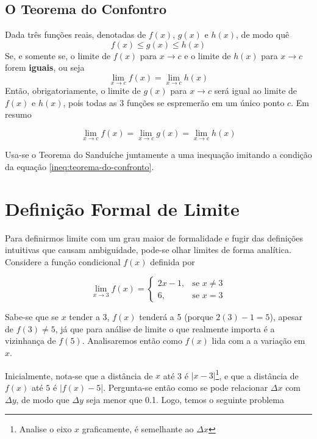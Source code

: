 \subsection{O Teorema do Confontro}

Dada três funções reais, denotadas de $f(x)$, $g(x)$ e $h(x)$, de modo quê
\begin{equation}
\label{ineq:teorema-do-confronto}
f(x) \leq g(x) \leq h(x)
\end{equation}
Se, e somente se, o limite de $f(x)$ para $x\to c$ e o limite de $h(x)$ para $x\to c$ forem \textbf{iguais}, ou seja
\begin{equation*}
  \lim_{x\to c} f(x) = \lim_{x\to c} h(x)
\end{equation*}
Então, obrigatoriamente, o limite de $g(x)$ para $x\to c$ será igual ao limite de $f(x)$ e $h(x)$, pois todas as 3 funções se espremerão em um único ponto $c$. Em resumo

\begin{equation}
\lim_{x\to c} f(x) = \lim_{x\to c} g(x) = \lim_{x\to c} h(x)
\end{equation}

Usa-se o Teorema do Sanduíche juntamente a uma inequação imitando a condição da equação \ref{ineq:teorema-do-confronto}.

\section{Definição Formal de Limite}

Para definirmos limite com um grau maior de formalidade e fugir das definições intuitivas que causam ambiguidade, pode-se olhar limites de forma analítica. Considere a função condicional $f(x)$ definida por

\[
  \lim_{x\to 3} f(x)=
  \begin{cases}
    2x - 1,& \text{se } x\neq 3 \\
    6,& \text{se } x = 3
  \end{cases}
\]

Sabe-se que se $x$ tender a 3, $f(x)$ tenderá a 5 (porque $2(3) - 1 = 5$), apesar de $f(3) \neq 5$, já que para análise de limite o que realmente importa é a vizinhança de $f(5)$. Analisaremos então como $f(x)$ lida com a a variação em $x$.

Inicialmente, nota-se que a distância de $x$ até 3 é $|x - 3|$\footnote{Analise o eixo $x$ graficamente, é semelhante ao $\Delta x$}, e que a distância de $f(x)$
até $5$ é $|f(x) - 5$|. Pergunta-se então como se pode relacionar $\Delta x$ com
$\Delta y$, de modo que $\Delta y$ seja menor que 0.1. Logo, temos o seguinte problema

